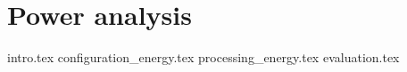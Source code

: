 \chapter{Power analysis}
{intro.tex}
{configuration_energy.tex}
{processing_energy.tex}
{evaluation.tex}